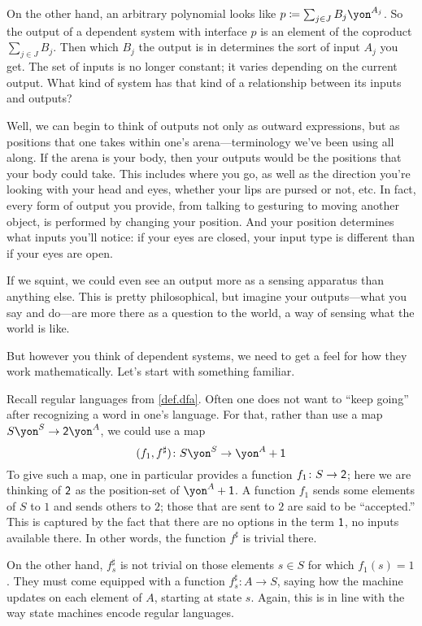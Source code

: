 \documentclass[Book-Poly]{subfiles}
\begin{document}
On the other hand, an arbitrary polynomial looks like $p\coloneqq\sum_{j \in J} B_j\yon^{A_j}$.
So the output of a dependent system with interface $p$ is an element of the coproduct $\sum_{j \in J} B_j$.
Then which $B_j$ the output is in determines the sort of input $A_j$ you get.
The set of inputs is no longer constant; it varies depending on the current output.
What kind of system has that kind of a relationship between its inputs and outputs?

Well, we can begin to think of outputs not only as outward expressions, but as positions that one takes within one's arena---terminology we've been using all along.
If the arena is your body, then your outputs would be the positions that your body could take.
This includes where you go, as well as the direction you're looking with your head and eyes, whether your lips are pursed or not, etc.
In fact, every form of output you provide, from talking to gesturing to moving another object, is performed by changing your position. And your position determines what inputs you'll notice: if your eyes are closed, your input type is different than if your eyes are open.


If we squint, we could even see an output more as a sensing apparatus than anything else. This is pretty philosophical, but imagine your outputs---what you say and do---are more there as a question to the world, a way of sensing what the world is like.

But however you think of dependent systems, we need to get a feel for how they work mathematically. Let's start with something familiar.

\begin{example}\label{ex.regular_lang_stop}
Recall regular languages from \cref{def.dfa}. Often one does not want to ``keep going'' after recognizing a word in one's language. For that, rather than use a map $S\yon^S\to \2\yon^A$, we could use a map
\[
(f_1,f^\sharp)\colon S\yon^S\to \yon^A+\1
\]
To give such a map, one in particular provides a function $f_1\colon S\to\textsf{2}$; here we are thinking of $\textsf{2}$ as the position-set of $\yon^A+\1$. A function $f_1$ sends some elements of $S$ to $1$ and sends others to $2$; those that are sent to $2$ are said to be ``accepted.'' This is captured by the fact that there are no options in the term $\textsf{1}$, no inputs available there. In other words, the function $f^\sharp$ is trivial there.

On the other hand, $f^\sharp_s$ is not trivial on those elements $s\in S$ for which $f_1(s)=1$. They must come equipped with a function $f^\sharp_s\colon A\to S$, saying how the machine updates on each element of $A$, starting at state $s$. Again, this is in line with the way state machines encode regular languages.
\end{example}
\end{document}
